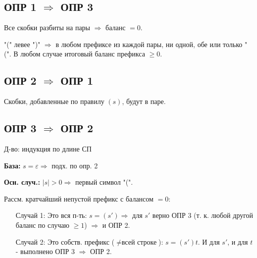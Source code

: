 \subsection{ОПР 1 $\Rightarrow$ ОПР 3}
Все скобки разбиты на пары $\Rightarrow$ баланс $ = 0$.

 "(" левее ")" $\Rightarrow$ в любом префиксе из каждой пары, ни одной, обе или только "(". В любом случае итоговый баланс префикса $\geq 0$.

\subsection{ОПР 2 $\Rightarrow$ ОПР 1}

Скобки, добавленные по правилу $(s)$, будут в паре.

\subsection{ОПР 3 $\Rightarrow$ ОПР 2}

Д-во: индукция по длине СП

\textbf{База:} $s = \varepsilon \Rightarrow $ подх. по опр. 2

\textbf{Осн. случ.:} $|s| > 0 \Rightarrow $ первый символ "(".

Рассм. кратчайший непустой префикс с балансом  $ = 0$:
\begin{itemize}
    \item [Случай 1: ] Это вся п-ть: $ s = (s') \Rightarrow $ для $s'$ верно ОПР 3 (т. к. любой другой баланс по случаю $ \geq 1$) $\Rightarrow$ и ОПР 2.
    \item [Случай 2: ] Это собств. префикс ($\neq \text{всей строке}$): $s = (s')t$. И для $s'$, и для $t$ - выполнено ОПР 3 $ \Rightarrow $ ОПР 2.
\end{itemize}

